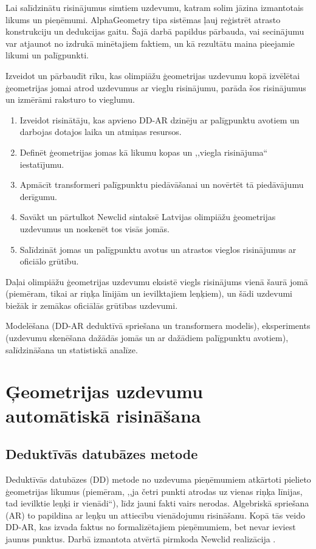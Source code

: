 \documentclass[nolabels]{../template/zpd}
\begin{document}
Lai salīdzinātu risinājumus simtiem uzdevumu, katram solim jāzina izmantotais likums un pieņēmumi. AlphaGeometry tipa sistēmas  ļauj reģistrēt atrasto konstrukciju un dedukcijas gaitu. Šajā darbā papildus pārbauda, vai secinājumu var atjaunot no izdrukā minētajiem faktiem, un kā rezultātu maina pieejamie likumi un palīgpunkti.

Izveidot un pārbaudīt rīku, kas olimpiāžu ģeometrijas uzdevumu kopā izvēlētai
ģeometrijas jomai atrod uzdevumus ar vieglu risinājumu, parāda šos risinājumus un izmērāmi raksturo
to vieglumu.

\begin{enumerate}
  \item Izveidot risinātāju, kas apvieno DD-AR dzinēju ar palīgpunktu avotiem un darbojas
        dotajos laika un atmiņas resursos.
  \item Definēt ģeometrijas jomas kā likumu kopas un ,,viegla risinājuma`` iestatījumu.
  \item Apmācīt transformeri palīgpunktu piedāvāšanai un novērtēt tā piedāvājumu derīgumu.
  \item Savākt un pārtulkot Newclid sintaksē Latvijas olimpiāžu ģeometrijas uzdevumus un
        noskenēt tos visās jomās.
  \item Salīdzināt jomas un palīgpunktu avotus un atrastos vieglos risinājumus ar oficiālo grūtību.
\end{enumerate}

Daļai olimpiāžu ģeometrijas uzdevumu eksistē viegls risinājums vienā šaurā jomā
(piemēram, tikai ar riņķa līnijām un ievilktajiem leņķiem), un šādi uzdevumi biežāk ir zemākas
oficiālās grūtības uzdevumi.

Modelēšana (DD-AR deduktīvā spriešana un transformera modelis),
eksperiments (uzdevumu skenēšana dažādās jomās un ar dažādiem palīgpunktu avotiem), salīdzināšana
un statistiskā analīze.

\section{Ģeometrijas uzdevumu automātiskā risināšana}
\subsection{Deduktīvās datubāzes metode}
Deduktīvās datubāzes (DD) metode  no uzdevuma pieņēmumiem atkārtoti
pielieto ģeometrijas likumus (piemēram, ,,ja četri punkti atrodas uz vienas riņķa līnijas, tad
ievilktie leņķi ir vienādi``), līdz jauni fakti vairs nerodas. Algebriskā spriešana (AR) to papildina
ar leņķu un attiecību vienādojumu risināšanu. Kopā tās veido DD-AR, kas izvada faktus no formalizētajiem pieņēmumiem,
bet nevar ieviest jaunus punktus. Darbā izmantota atvērtā pirmkoda Newclid realizācija
.
\end{document}
